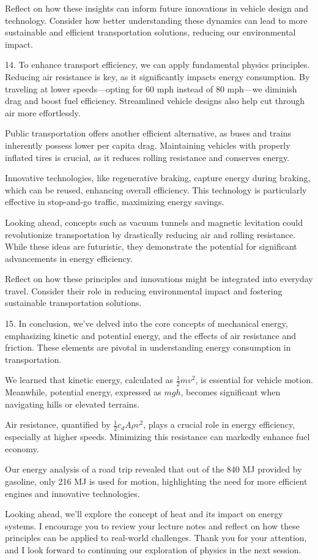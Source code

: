 \begin{tcolorbox}[size=title,opacityfill=0.05,breakable]
Reflect on how these insights can inform future innovations in vehicle design and technology. Consider how better understanding these dynamics can lead to more sustainable and efficient transportation solutions, reducing our environmental impact.


14. To enhance transport efficiency, we can apply fundamental physics principles. Reducing air resistance is key, as it significantly impacts energy consumption. By traveling at lower speeds—opting for 60 mph instead of 80 mph—we diminish drag and boost fuel efficiency. Streamlined vehicle designs also help cut through air more effortlessly.

Public transportation offers another efficient alternative, as buses and trains inherently possess lower per capita drag. Maintaining vehicles with properly inflated tires is crucial, as it reduces rolling resistance and conserves energy.

Innovative technologies, like regenerative braking, capture energy during braking, which can be reused, enhancing overall efficiency. This technology is particularly effective in stop-and-go traffic, maximizing energy savings.

Looking ahead, concepts such as vacuum tunnels and magnetic levitation could revolutionize transportation by drastically reducing air and rolling resistance. While these ideas are futuristic, they demonstrate the potential for significant advancements in energy efficiency.

Reflect on how these principles and innovations might be integrated into everyday travel. Consider their role in reducing environmental impact and fostering sustainable transportation solutions.


15. In conclusion, we've delved into the core concepts of mechanical energy, emphasizing kinetic and potential energy, and the effects of air resistance and friction. These elements are pivotal in understanding energy consumption in transportation.

We learned that kinetic energy, calculated as \( \frac{1}{2}mv^2 \), is essential for vehicle motion. Meanwhile, potential energy, expressed as \( mgh \), becomes significant when navigating hills or elevated terrains.

Air resistance, quantified by \( \frac{1}{2}c_d A \rho v^2 \), plays a crucial role in energy efficiency, especially at higher speeds. Minimizing this resistance can markedly enhance fuel economy.

Our energy analysis of a road trip revealed that out of the 840 MJ provided by gasoline, only 216 MJ is used for motion, highlighting the need for more efficient engines and innovative technologies.

Looking ahead, we'll explore the concept of heat and its impact on energy systems. I encourage you to review your lecture notes and reflect on how these principles can be applied to real-world challenges. Thank you for your attention, and I look forward to continuing our exploration of physics in the next session.
\end{tcolorbox}



